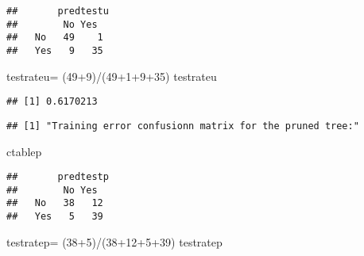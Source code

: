 \documentclass[
]{article}
\newenvironment{Shaded}{\begin{snugshade}}{\end{snugshade}}
\newcommand{\DecValTok}[1]{\textcolor[rgb]{0.00,0.00,0.81}{#1}}
\newcommand{\FunctionTok}[1]{\textcolor[rgb]{0.00,0.00,0.00}{#1}}
\newcommand{\NormalTok}[1]{#1}
\newcommand{\OtherTok}[1]{\textcolor[rgb]{0.56,0.35,0.01}{#1}}
\newcommand{\SpecialCharTok}[1]{\textcolor[rgb]{0.00,0.00,0.00}{#1}}
\newcommand{\StringTok}[1]{\textcolor[rgb]{0.31,0.60,0.02}{#1}}
\begin{document}
\begin{verbatim}
##       predtestu
##        No Yes 
##   No   49    1
##   Yes   9   35
\end{verbatim}

\begin{Shaded}
\begin{Highlighting}[]
\NormalTok{testrateu}\OtherTok{=}\NormalTok{ (}\DecValTok{49}\SpecialCharTok{+}\DecValTok{9}\NormalTok{)}\SpecialCharTok{/}\NormalTok{(}\DecValTok{49}\SpecialCharTok{+}\DecValTok{1}\SpecialCharTok{+}\DecValTok{9}\SpecialCharTok{+}\DecValTok{35}\NormalTok{)}
\NormalTok{testrateu}
\end{Highlighting}
\end{Shaded}

\begin{verbatim}
## [1] 0.6170213
\end{verbatim}

\begin{Shaded}
\end{Shaded}

\begin{verbatim}
## [1] "Training error confusionn matrix for the pruned tree:"
\end{verbatim}

\begin{Shaded}
\begin{Highlighting}[]
\NormalTok{ctablep}
\end{Highlighting}
\end{Shaded}

\begin{verbatim}
##       predtestp
##        No Yes 
##   No   38   12
##   Yes   5   39
\end{verbatim}

\begin{Shaded}
\begin{Highlighting}[]
\NormalTok{testratep}\OtherTok{=}\NormalTok{ (}\DecValTok{38}\SpecialCharTok{+}\DecValTok{5}\NormalTok{)}\SpecialCharTok{/}\NormalTok{(}\DecValTok{38}\SpecialCharTok{+}\DecValTok{12}\SpecialCharTok{+}\DecValTok{5}\SpecialCharTok{+}\DecValTok{39}\NormalTok{)}
\NormalTok{testratep}
\end{Highlighting}
\end{Shaded}
\end{document}
